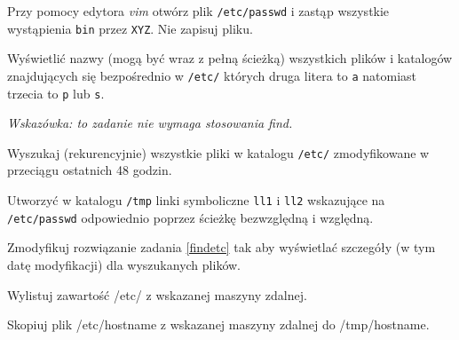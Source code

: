 % 
% 
% 
% 



\dbEntryCheckResults
Przy pomocy edytora \textit{vim} otwórz plik \Verb#/etc/passwd# i zastąp wszystkie wystąpienia \Verb#bin# przez \Verb#XYZ#. Nie zapisuj pliku.
\fi

\dbEntryCheckResults
Wyświetlić nazwy (mogą być wraz z pełną ścieżką) wszystkich plików i katalogów znajdujących się bezpośrednio w \texttt{/etc/} których druga litera to \texttt{a} natomiast trzecia to \texttt{p} lub \texttt{s}.

\emph{Wskazówka: to zadanie nie wymaga stosowania find.}
\fi

\dbEntryCheckResults
Wyszukaj (rekurencyjnie) wszystkie pliki w katalogu \texttt{/etc/} zmodyfikowane w przeciągu ostatnich 48 godzin.
\fi

\dbEntryCheckResults
Utworzyć w katalogu \texttt{/tmp} linki symboliczne \texttt{ll1} i \texttt{ll2} wskazujące na \texttt{/etc/passwd} odpowiednio poprzez ścieżkę bezwzględną i względną.
\fi

\dbEntryCheckResults
Zmodyfikuj rozwiązanie zadania \ref{findetc} tak aby wyświetlać szczegóły (w tym datę modyfikacji) dla wyszukanych plików.
\fi


\dbEntryCheckResults
Wylistuj zawartość /etc/ z wskazanej maszyny zdalnej.
\fi

\dbEntryCheckResults
Skopiuj plik /etc/hostname z wskazanej maszyny zdalnej do /tmp/hostname.
\fi
